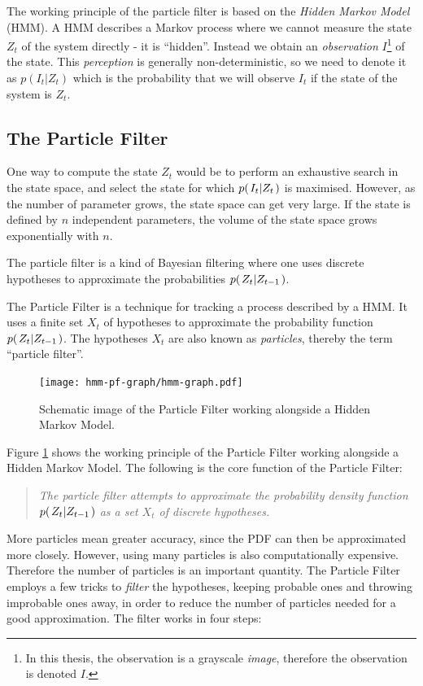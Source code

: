 The working principle of the particle filter is based on the \emph{Hidden Markov Model} (HMM). A HMM describes a Markov process where we cannot measure the state $Z_t$ of the system directly - it is ``hidden''\cite{EncyclopediaMachineLearning}. Instead we obtain an \emph{observation} $I$\footnote{In this thesis, the observation is a grayscale \emph{image}, therefore the observation is denoted $I$.}  of the state. This \emph{perception} is generally non-deterministic, so we need to denote it as $p(I_t|Z_t)$ which is the probability that we will observe $I_t$ if the state of the system is $Z_t$.

\subsection{The Particle Filter}

One way to compute the state $Z_t$ would be to perform an exhaustive search in the state space, and select the state for which $p{(\left. I_t \middle\vert Z_t \right.)}$ is maximised. However, as the number of parameter grows, the state space can get very large. If the state is defined by $n$ independent parameters, the volume of the state space grows exponentially with $n$.

The particle filter is a kind of Bayesian filtering where one uses discrete hypotheses to approximate the probabilities $p{(\left. Z_t \middle\vert Z_{t-1} \right.)}$.

The Particle Filter is a technique for tracking a process described by a HMM. It uses a finite set $X_t$ of hypotheses to approximate the probability function $p{(\left. Z_t \middle\vert Z_{t-1} \right.)}$. The hypotheses $X_t$ are also known as \emph{particles}, thereby the term ``particle filter''.

\begin{figure}
  \centering
  \texttt{[image: hmm-pf-graph/hmm-graph.pdf]}
  \caption{Schematic image of the Particle Filter working alongside a Hidden Markov Model.}
  \label{fig:hmm-graph}
\end{figure}

Figure \ref{fig:hmm-graph} shows the working principle of the Particle Filter working alongside a Hidden Markov Model. The following is the core function of the Particle Filter:

\begin{quote}
  \emph{The particle filter attempts to approximate the probability density function $p{(\left. Z_t \middle\vert Z_{t-1} \right.)}$ as a set $X_t$ of discrete hypotheses.}
\end{quote}

More particles mean greater accuracy, since the PDF can then be approximated more closely. However, using many particles is also computationally expensive. Therefore the number of particles is an important quantity. The Particle Filter employs a few tricks to \emph{filter} the hypotheses, keeping probable ones and throwing improbable ones away, in order to reduce the number of particles needed for a good approximation. The filter works in four steps:

